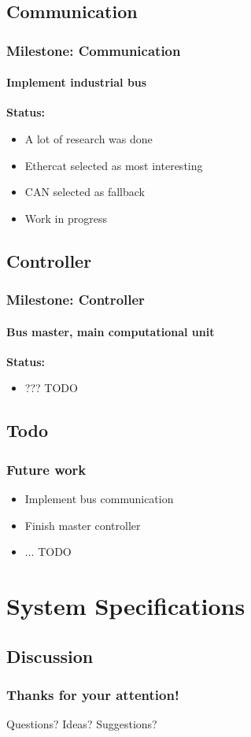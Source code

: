 \documentclass{beamer}
\begin{document}
\subsection{Communication}
\begin{frame}
  \frametitle{Milestone: Communication}
  \framesubtitle{Implement industrial bus}
  \textbf{Status:}
	\begin{itemize}
		\item A lot of research was done
		\item Ethercat selected as most interesting
		\item CAN selected as fallback
		\item Work in progress
	\end{itemize}
\end{frame}

\subsection{Controller}
\begin{frame}
  \frametitle{Milestone: Controller}
  \framesubtitle{Bus master, main computational unit}
  \textbf{Status:}
	\begin{itemize}
		\item ??? TODO
	\end{itemize}
\end{frame}

\subsection{Todo}
\begin{frame}
  \frametitle{Future work}
  	\begin{itemize}
		\item Implement bus communication
		\item Finish master controller
		\item ... TODO
	\end{itemize}
\end{frame}

\section{System Specifications}

\subsection{Discussion}
\begin{frame}
	\frametitle{Thanks for your attention!}
	\huge{Questions? Ideas? Suggestions?}
\end{frame}
\end{document}
